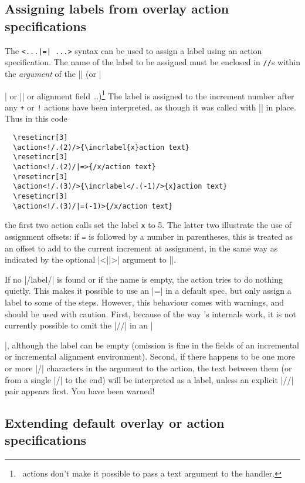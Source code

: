 \documentclass[a4paper]{ltxdoc}
\begin{document}
\subsection{Assigning labels from overlay action specifications}

The \verb^<...|=^\verb^| ...>^ syntax can
be used to assign a label using an action specification.  The name of the label
to be assigned must be enclosed in \texttt{//}s within the \emph{argument} of
the |\action| (or |\item| or |\next| or alignment field
\dots)\footnote{\beamer\ actions don't make it possible to pass a text argument
  to the handler.}  The label is assigned to the increment number after any
\texttt{+} or \texttt{!} actions have been interpreted, as though it was called
with |\incrlabel| in place.  Thus in this code \example
\begin{verbatim}
  \resetincr[3]
  \action<!/.(2)/>{\incrlabel{x}action text}
  \resetincr[3]
  \action<!/.(2)/|=>{/x/action text}
  \resetincr[3]
  \action<!/.(3)/>{\incrlabel</.(-1)/>{x}action text}
  \resetincr[3]
  \action<!/.(3)/|=(-1)>{/x/action text}
\end{verbatim}
the first two action calls set the label \texttt{x} to 5.  The latter two
illustrate the use of assignment offsets: if \texttt{=} is followed by a number
in parentheses, this is treated as an offset to add to the current increment at
assignment, in the same way as indicated by the optional |<||>|
argument to |\incrlabel|.

If no |/label/| is found or if the name is empty, the action tries to do nothing
quietly.  This makes it possible to use an |=| in a default spec, but only
assign a label to some of the steps.  However, this behaviour comes with
warnings, and should be used with caution.  First, because of the way \beamer's
internals work, it is not currently possible to omit the |//| in an |\item|,
although the label can be empty (omission is fine in the fields of an
incremental or incremental alignment environment).  Second, if there happens to
be one more or more |/| characters in the argument to the action, the text
between them (or from a single |/| to the end) will be interpreted as a label,
unless an explicit |//| pair appears first.  You have been warned!

\subsection{Extending default overlay or action specifications}
\end{document}
